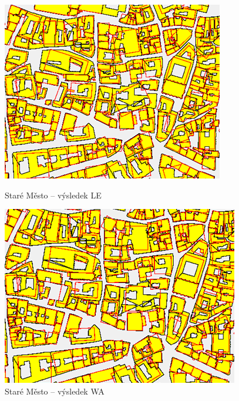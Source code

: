 \documentclass{article}
\begin{document}
\begin{spacing}{1.5}
\begin{figure}[htbp]
  \centering
  \begin{minipage}[b]{0.37\textwidth}
    \includegraphics[width=\textwidth]{images/SM_le.png}
    \caption{Staré Město – výsledek LE}
  \end{minipage}
  \hfill
  \begin{minipage}[b]{0.37\textwidth}
    \includegraphics[width=\textwidth]{images/SM_wa.png}
    \caption{Staré Město – výsledek WA}
  \end{minipage}
\end{figure}


\end{spacing}
\end{document}
